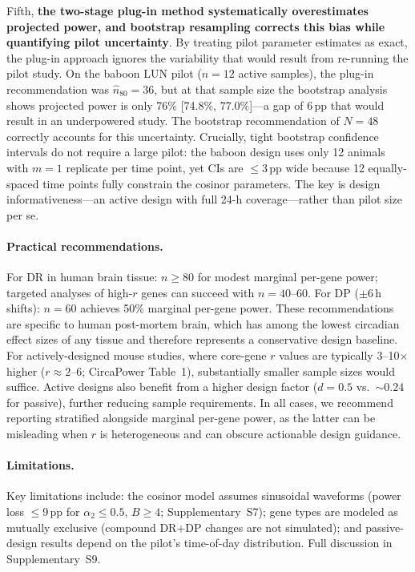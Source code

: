 \documentclass{article}
\begin{document}
Fifth, \textbf{the two-stage plug-in method systematically overestimates projected power, and bootstrap resampling corrects this bias while quantifying pilot uncertainty}. By treating pilot parameter estimates as exact, the plug-in approach ignores the variability that would result from re-running the pilot study. On the baboon LUN pilot ($n = 12$ active samples), the plug-in recommendation was $\hat{n}_{80} = 36$, but at that sample size the bootstrap analysis shows projected power is only 76\% [74.8\%, 77.0\%]---a gap of 6\,pp that would result in an underpowered study. The bootstrap recommendation of $N = 48$ correctly accounts for this uncertainty. Crucially, tight bootstrap confidence intervals do not require a large pilot: the baboon design uses only 12 animals with $m = 1$ replicate per time point, yet CIs are $\leq 3$\,pp wide because 12 equally-spaced time points fully constrain the cosinor parameters. The key is design informativeness---an active design with full 24-h coverage---rather than pilot size per se.

\paragraph{Practical recommendations.} For DR in human brain tissue: $n \geq 80$ for modest marginal per-gene power; targeted analyses of high-$r$ genes can succeed with $n = 40$--60. For DP ($\pm$6\,h shifts): $n = 60$ achieves 50\% marginal per-gene power. These recommendations are specific to human post-mortem brain, which has among the lowest circadian effect sizes of any tissue \cite{zong2023circapower} and therefore represents a conservative design baseline. For actively-designed mouse studies, where core-gene $r$ values are typically 3--10$\times$ higher ($r \approx 2$--$6$; CircaPower Table~1), substantially smaller sample sizes would suffice. Active designs also benefit from a higher design factor ($d = 0.5$ vs.\ ${\sim}0.24$ for passive), further reducing sample requirements. In all cases, we recommend reporting stratified alongside marginal per-gene power, as the latter can be misleading when $r$ is heterogeneous and can obscure actionable design guidance.


\paragraph{Limitations.} Key limitations include: the cosinor model assumes
sinusoidal waveforms (power loss $\leq$9\,pp for $\alpha_2\leq 0.5$,
$B\geq 4$; Supplementary~S7); gene types are modeled as mutually exclusive
(compound DR+DP changes are not simulated); and passive-design results depend
on the pilot's time-of-day distribution. Full discussion in Supplementary~S9.
\end{document}
